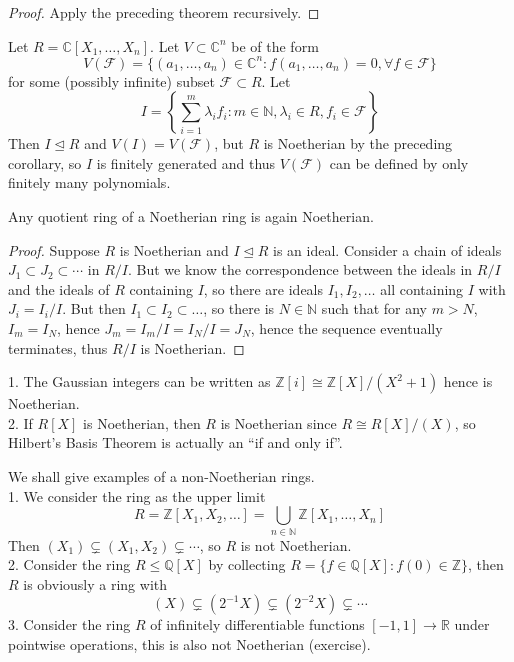 \begin{proof}
    Apply the preceding theorem recursively.
\end{proof}
\begin{example}
    Let $R=\mathbb C[X_1,\ldots,X_n]$.
    Let $V\subset\mathbb C^n$ be of the form
    $$V(\mathcal F)=\{(a_1,\ldots,a_n)\in\mathbb C^n:f(a_1,\ldots,a_n)=0,\forall f\in\mathcal F\}$$
    for some (possibly infinite) subset $\mathcal F\subset R$.
    Let
    $$I=\left\{\sum_{i=1}^m\lambda_if_i:m\in\mathbb N,\lambda_i\in R,f_i\in\mathcal F\right\}$$
    Then $I\unlhd R$ and $V(I)=V(\mathcal F)$, but $R$ is Noetherian by the preceding corollary, so $I$ is finitely generated and thus $V(\mathcal F)$ can be defined by only finitely many polynomials.
\end{example}
\begin{lemma}
    Any quotient ring of a Noetherian ring is again Noetherian.
\end{lemma}
\begin{proof}
    Suppose $R$ is Noetherian and $I\unlhd R$ is an ideal.
    Consider a chain of ideals $J_1\subset J_2\subset\cdots$ in $R/I$.
    But we know the correspondence between the ideals in $R/I$ and the ideals of $R$ containing $I$, so there are ideals $I_1,I_2,\ldots$ all containing $I$ with $J_i=I_i/I$.
    But then $I_1\subset I_2\subset\ldots$, so there is $N\in\mathbb N$ such that for any $m>N$, $I_m=I_N$, hence $J_m=I_m/I=I_N/I=J_N$, hence the sequence eventually terminates, thus $R/I$ is Noetherian.
\end{proof}
\begin{example}
    1. The Gaussian integers can be written as $\mathbb Z[i]\cong\mathbb Z[X]/(X^2+1)$ hence is Noetherian.\\
    2. If $R[X]$ is Noetherian, then $R$ is Noetherian since $R\cong R[X]/(X)$, so Hilbert's Basis Theorem is actually an ``if and only if''.
\end{example}
\begin{example}
    We shall give examples of a non-Noetherian rings.\\
    1. We consider the ring as the upper limit
    $$R=\mathbb Z[X_1,X_2,\ldots]=\bigcup_{n\in\mathbb N}\mathbb Z[X_1,\ldots,X_n]$$
    Then $(X_1)\subsetneq (X_1,X_2)\subsetneq\cdots$, so $R$ is not Noetherian.\\
    2. Consider the ring $R\le \mathbb Q[X]$ by collecting $R=\{f\in\mathbb Q[X]:f(0)\in\mathbb Z\}$, then $R$ is obviously a ring with
    $$(X)\subsetneq (2^{-1}X)\subsetneq (2^{-2}X)\subsetneq\cdots$$
    3. Consider the ring $R$ of infinitely differentiable functions $[-1,1]\to\mathbb R$ under pointwise operations, this is also not Noetherian (exercise).
\end{example}
